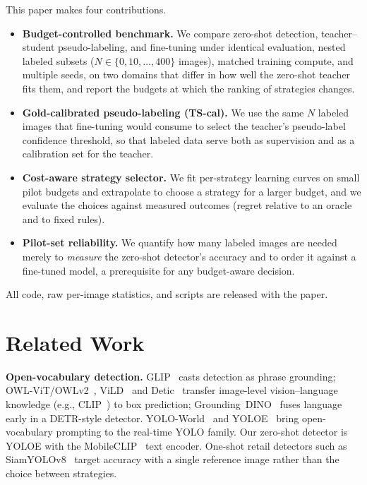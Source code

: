 This paper makes four contributions.
\begin{itemize}
\item \textbf{Budget-controlled benchmark.} We compare zero-shot detection, teacher--student pseudo-labeling, and fine-tuning under identical evaluation, nested labeled subsets ($N\in\{0,10,\dots,400\}$ images), matched training compute, and multiple seeds, on two domains that differ in how well the zero-shot teacher fits them, and report the budgets at which the ranking of strategies changes.
\item \textbf{Gold-calibrated pseudo-labeling (TS-cal).} We use the same $N$ labeled images that fine-tuning would consume to select the teacher's pseudo-label confidence threshold, so that labeled data serve both as supervision and as a calibration set for the teacher.
\item \textbf{Cost-aware strategy selector.} We fit per-strategy learning curves on small pilot budgets and extrapolate to choose a strategy for a larger budget, and we evaluate the choices against measured outcomes (regret relative to an oracle and to fixed rules).
\item \textbf{Pilot-set reliability.} We quantify how many labeled images are needed merely to \emph{measure} the zero-shot detector's accuracy and to order it against a fine-tuned model, a prerequisite for any budget-aware decision.
\end{itemize}
All code, raw per-image statistics, and scripts are released with the paper.

\section{Related Work}
\textbf{Open-vocabulary detection.} GLIP~\cite{li2022glip} casts detection as phrase grounding; OWL-ViT/OWLv2~\cite{minderer2022owlvit,minderer2023owlv2}, ViLD~\cite{gu2022vild} and Detic~\cite{zhou2022detic} transfer image-level vision--language knowledge (e.g., CLIP~\cite{radford2021clip}) to box prediction; Grounding~DINO~\cite{liu2024groundingdino} fuses language early in a DETR-style detector. YOLO-World~\cite{cheng2024yoloworld} and YOLOE~\cite{wang2025yoloe} bring open-vocabulary prompting to the real-time YOLO family. Our zero-shot detector is YOLOE with the MobileCLIP~\cite{vasu2024mobileclip} text encoder. One-shot retail detectors such as SiamYOLOv8~\cite{desmarescaux2025siamyolov8} target accuracy with a single reference image rather than the choice between strategies.


